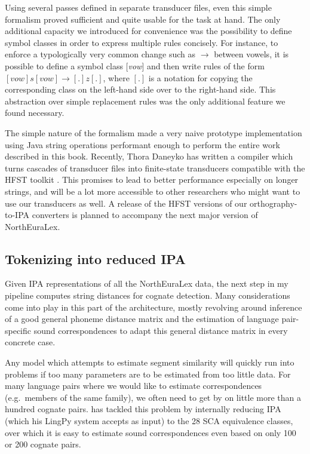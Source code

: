 Using several passes defined in separate transducer files, even this simple formalism proved sufficient and quite usable for the task at hand. The only additional capacity we introduced for convenience was the possibility to define symbol classes in order to express multiple rules concisely. For instance, to enforce a typologically very common change such as \ipa{[s]} $\rightarrow$ \ipa{[z]} between vowels, it is possible to define a symbol class [\textit{vow}] and then write rules of the form $[vow]s[vow] \rightarrow [.]z[.]$, where $[.]$ is a notation for copying the corresponding class on the left-hand side over to the right-hand side. This abstraction over simple replacement rules was the only additional feature we found necessary.

The simple nature of the formalism made a very naive prototype implementation using Java string operations performant enough to perform the entire work described in this book. Recently, Thora Daneyko has written a compiler which turns cascades of transducer files into finite-state transducers compatible with the HFST toolkit \citep{linden_ea_2011}. This promises to lead to better performance especially on longer strings, and will be a lot more accessible to other researchers who might want to use our transducers as well. A release of the HFST versions of our orthography-to-IPA converters is planned to accompany the next major version of NorthEuraLex.

\subsection{Tokenizing into reduced IPA}
Given IPA representations of all the NorthEuraLex data, the next step in my pipeline computes string distances for cognate detection. Many considerations come into play in this part of the architecture, mostly revolving around inference of a good general phoneme distance matrix and the estimation of language pair-specific sound correspondences to adapt this general distance matrix in every concrete case.

Any model which attempts to estimate segment similarity will quickly run into problems if too many parameters are to be estimated from too little data. For many language pairs where we would like to estimate correspondences (e.g.\ members of the same family), we often need to get by on little more than a hundred cognate pairs. \cite{list2012} has tackled this problem by internally reducing IPA (which his LingPy system accepts as input) to the 28 SCA equivalence classes, over which it is easy to estimate sound correspondences even based on only 100 or 200 cognate pairs.

